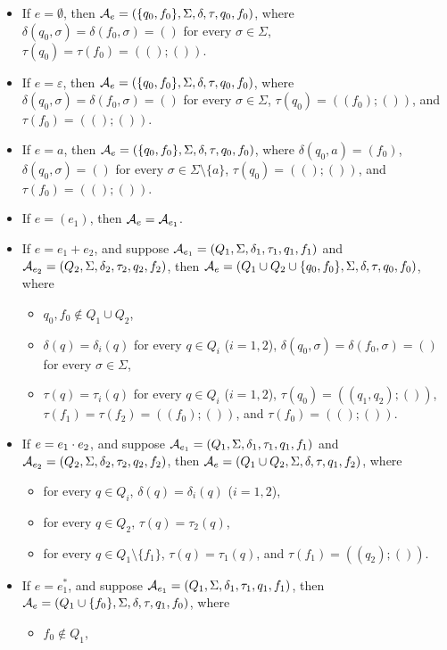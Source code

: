 \begin{itemize}
\item If $e =\emptyset$, then $\mathcal{A}_e = (\{q_0,f_0\}, \Sigma, \delta, \tau, q_0, f_0)$, where $\delta(q_0, \sigma) = \delta(f_0, \sigma) = ()$ for every $\sigma \in \Sigma$, $\tau(q_0) = \tau(f_0)= ((); ())$.

  \item If $e = \varepsilon$, then  $\mathcal{A}_e = (\{q_0, f_0\}, \Sigma, \delta, \tau, q_0, f_0)$, where  $\delta(q_0, \sigma) = \delta(f_0, \sigma) = ()$ for every $\sigma \in \Sigma$, $\tau(q_0) = ((f_0); ())$, and $\tau(f_0) = ((); ())$. 

  \item If $e = a$, then $\mathcal{A}_e = (\{q_0, f_0\}, \Sigma, \delta, \tau, q_0, f_0)$, where  $\delta(q_0, a) = (f_0)$, $\delta(q_0, \sigma) = ()$ for every $\sigma \in \Sigma \setminus \{a\}$, $\tau(q_0) = ((); ())$, and $\tau(f_0) = ((); ())$.
    
  \item If $e = (e_1)$, then $\mathcal{A}_e = \mathcal{A}_{e_1}$.
  
  \item If $e = e_1 + e_2$, and suppose $\mathcal{A}_{e_1} = (Q_1,
  \Sigma, \delta_1, \tau_1, q_1, f_1)$ and $\mathcal{A}_{e_2} = (Q_2, \Sigma,
  \delta_2, \tau_2, q_2, f_2)$, then $\mathcal{A}_e = (Q_1 \cup Q_2 \cup \{q_0, f_0\}, \Sigma,
  \delta, \tau, q_0, f_0)$, where  
  \begin{itemize}
 \item $q_0, f_0 \not \in Q_1 \cup Q_2$, 
 \item $\delta(q) = \delta_i(q)$ for every $q \in Q_i$ ($i=1,2$), 
$\delta(q_0, \sigma) = \delta(f_0, \sigma) = ()$ for every $\sigma \in \Sigma$, 
%
 \item $\tau(q) = \tau_i(q)$ for every $q \in Q_i$ ($i =1,2$), $\tau(q_0) = ((q_1,q_2); ())$,  $\tau(f_1) = \tau(f_2) = ((f_0); ())$, and $\tau(f_0) = ((); ())$.
 \end{itemize}
%
  \item If $e = e_1 \cdot e_2$, and suppose $\mathcal{A}_{e_1} = (Q_1,
  \Sigma, \delta_1, \tau_1, q_1, f_1)$ and $\mathcal{A}_{e_2} = (Q_2, \Sigma,
  \delta_2, \tau_2, q_2, f_2)$, then $\mathcal{A}_e = ( Q_1 \cup Q_2, \Sigma, \delta, \tau, q_1,
  f_2)$, where 
  \begin{itemize}
    \item for every $q \in Q_i$, $\delta(q) = \delta_i(q)$ ($i = 1,2$),
    
    \item for every $q \in Q_2$, $\tau(q) = \tau_2(q)$, 
%
    \item for every $q \in Q_1 \setminus \{f_1\}$, $\tau(q) = \tau_1(q)$, and $\tau(f_1) = ((q_2); ())$.
  \end{itemize}
%  
  \item If $e = e_1^{\ast}$, and suppose  $\mathcal{A}_{e_1} = (Q_1,
  \Sigma, \delta_1, \tau_1, q_1, f_1)$, then $\mathcal{A}_e = (Q_1 \cup \{f_0\}, \Sigma,
  \delta, \tau, q_1, f_0)$, where 
  \begin{itemize}
  \item $f_0 \not \in Q_1$,
  

\end{itemize}
\end{itemize}
